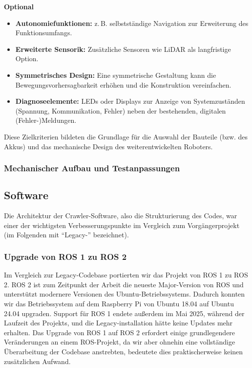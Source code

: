 \textbf{Optional}
\begin{itemize}
  \item \textbf{Autonomiefunktionen:} z.\,B. selbstständige Navigation zur Erweiterung des Funktionsumfangs.
  \item \textbf{Erweiterte Sensorik:} Zusätzliche Sensoren wie LiDAR als langfristige Option.
  \item \textbf{Symmetrisches Design:} Eine symmetrische Gestaltung kann die Bewegungsvorhersagbarkeit erhöhen und die Konstruktion vereinfachen.
  \item \textbf{Diagnoseelemente:} LEDs oder Displays zur Anzeige von Systemzuständen (Spannung, Kommunikation, Fehler) neben der bestehenden, digitalen (Fehler-)Meldungen.
\end{itemize}

Diese Zielkriterien bildeten die Grundlage für die Auswahl der Bauteile (bzw. des Akkus) und das mechanische Design des weiterentwickelten Roboters.

\subsubsection{Mechanischer Aufbau und Testanpassungen}

\subsection{Software}

Die Architektur der Crawler-Software, also die Strukturierung des Codes, war einer der wichtigsten Verbesserungspunkte im Vergleich zum Vorgängerprojekt (im Folgenden mit ``Legacy-'' bezeichnet). 

\subsubsection{Upgrade von ROS 1 zu ROS 2}

Im Vergleich zur Legacy-Codebase portierten wir das Projekt von ROS 1 zu ROS 2. ROS 2 ist zum Zeitpunkt der Arbeit die neueste Major-Version von ROS und unterstützt modernere Versionen des Ubuntu-Betriebssystems. Dadurch konnten wir das Betriebssystem auf dem Raspberry Pi von Ubuntu 18.04 auf Ubuntu 24.04 upgraden. Support für ROS 1 endete außerdem im Mai 2025, während der Laufzeit des Projekts, und die Legacy-installation hätte keine Updates mehr erhalten. Das Upgrade von ROS 1 auf ROS 2 erfordert einige grundlegendere Veränderungen an einem ROS-Projekt, da wir aber ohnehin eine vollständige Überarbeitung der Codebase anstrebten, bedeutete dies praktischerweise keinen zusätzlichen Aufwand. 

